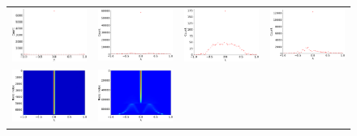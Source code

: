 \documentclass[senior,final,11pt]{iscs-thesis}
\begin{document}
\begin{figure}[htbp]
  \setlength\tabcolsep{0pt}
  \hspace{-3.0cm}
  \begin{tabular}{cccc}
    \includegraphics[width=45mm]{figure/ia-realitymtx_dos.png} &
    \includegraphics[width=45mm]{figure/ia-wiki-Talkmtx_dos.png} &
    \includegraphics[width=45mm]{figure/ia-fb-messagesmtx_dos.png} &
    \includegraphics[width=45mm]{figure/ia-enron-largemtx_dos.png} \\
    \includegraphics[width=45mm]{figure/ia-realitymtx_pdos.png} &
    \includegraphics[width=45mm]{figure/ia-wiki-Talkmtx_pdos.png} &

\end{tabular}
\end{figure}
\end{document}
